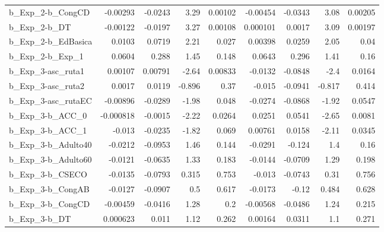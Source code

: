 \begin{tabular}{lrrrrrrrr}
b\_Exp\_2-b\_CongCD           &    -0.00293 &      -0.0243 &      3.29 &  0.00102 &   -0.00454 &     -0.0343 &         3.08 &       0.00205 \\
b\_Exp\_2-b\_DT               &    -0.00122 &      -0.0197 &      3.27 &  0.00108 &   0.000101 &      0.0017 &         3.09 &       0.00197 \\
b\_Exp\_2-b\_EdBasica         &      0.0103 &       0.0719 &      2.21 &    0.027 &    0.00398 &      0.0259 &         2.05 &          0.04 \\
b\_Exp\_2-b\_Exp\_1            &      0.0604 &        0.288 &      1.45 &    0.148 &     0.0643 &       0.296 &         1.41 &          0.16 \\
b\_Exp\_3-asc\_ruta1          &     0.00107 &      0.00791 &     -2.64 &  0.00833 &    -0.0132 &     -0.0848 &         -2.4 &        0.0164 \\
b\_Exp\_3-asc\_ruta2          &      0.0017 &       0.0119 &    -0.896 &     0.37 &     -0.015 &     -0.0941 &       -0.817 &         0.414 \\
b\_Exp\_3-asc\_rutaEC         &    -0.00896 &      -0.0289 &     -1.98 &    0.048 &    -0.0274 &     -0.0868 &        -1.92 &        0.0547 \\
b\_Exp\_3-b\_ACC\_0            &   -0.000818 &      -0.0015 &     -2.22 &   0.0264 &     0.0251 &      0.0541 &        -2.65 &        0.0081 \\
b\_Exp\_3-b\_ACC\_1            &      -0.013 &      -0.0235 &     -1.82 &    0.069 &    0.00761 &      0.0158 &        -2.11 &        0.0345 \\
b\_Exp\_3-b\_Adulto40         &     -0.0212 &      -0.0953 &      1.46 &    0.144 &    -0.0291 &      -0.124 &          1.4 &          0.16 \\
b\_Exp\_3-b\_Adulto60         &     -0.0121 &      -0.0635 &      1.33 &    0.183 &    -0.0144 &     -0.0709 &         1.29 &         0.198 \\
b\_Exp\_3-b\_CSECO            &     -0.0135 &      -0.0793 &     0.315 &    0.753 &     -0.013 &     -0.0743 &         0.31 &         0.756 \\
b\_Exp\_3-b\_CongAB           &     -0.0127 &      -0.0907 &       0.5 &    0.617 &    -0.0173 &       -0.12 &        0.484 &         0.628 \\
b\_Exp\_3-b\_CongCD           &    -0.00459 &      -0.0416 &      1.28 &      0.2 &   -0.00568 &     -0.0486 &         1.24 &         0.215 \\
b\_Exp\_3-b\_DT               &    0.000623 &        0.011 &      1.12 &    0.262 &    0.00164 &      0.0311 &          1.1 &         0.271 \\

\end{tabular}
